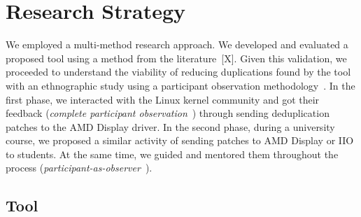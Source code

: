 \documentclass[10pt,conference]{IEEEtran}
\begin{document}
\section{Research Strategy}

We employed a multi-method research approach. We developed and evaluated a proposed tool using a method from the literature~[X]. Given this validation, we proceeded to understand the viability of reducing duplications found by the tool with an ethnographic study using a participant observation methodology~\cite{}. In the first phase, we interacted with the Linux kernel community and got their feedback (\textit{complete participant observation}~\cite{}) through sending deduplication patches to the AMD Display driver. In the second phase, during a university course, we proposed a similar activity of sending patches to AMD Display or IIO to students. At the same time, we guided and mentored them throughout the process (\textit{participant-as-observer}~\cite{}).



\subsection{Tool}
\end{document}
